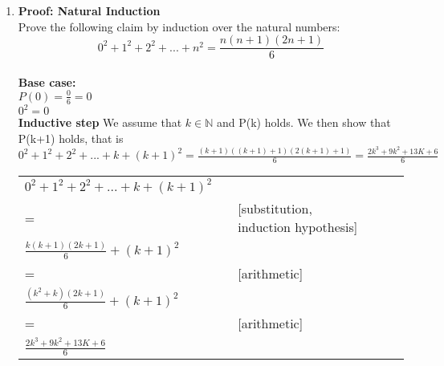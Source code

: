 \documentclass{article}
\begin{document}
\begin{enumerate}[\bf I.]
\item \textbf{Proof: Natural Induction} \\[8pt]
Prove the following claim by induction over the natural numbers:
\[\displaystyle 0^2 + 1^2 + 2^2 + ... + n^2 = \frac{n( n + 1 )( 2n + 1 )}{6}\] \\
\textbf{Base case:}\\
$P(0) = \frac{0} {6} = 0 $ \\
$0^2 = 0$ \\
\textbf{Inductive step} We assume that $k \in \mathbb{N}$ and P(k) holds. We then show that P(k+1) holds, that is $0^2 + 1^2 + 2^2 + ... + k + (k + 1)^2 = \frac{(k+1)( (k+1) + 1 )( 2(k+1) + 1 )}{6} = \frac{2k^3 + 9k^2 + 13K + 6}{6}$
\\
\begin{tabular}{l ll lll}
     $0^2 + 1^2 + 2^2 + ... + k + (k + 1)^2$  &    &  \\
     = &   & [substitution, induction hypothesis] \\
     $\frac{k( k + 1 )( 2k + 1 )}{6} + (k + 1)^2$  &    &  \\
     = &   & [arithmetic] \\
     $\frac{(k^2 + k)(2k + 1)}{6} + (k + 1)^2 $ & & \\
     = &   & [arithmetic] \\
     $\frac{2k^3 + 9k^2 + 13K + 6}{6}$  & & \\
\end{tabular} \\


\end{enumerate}
\end{document}
